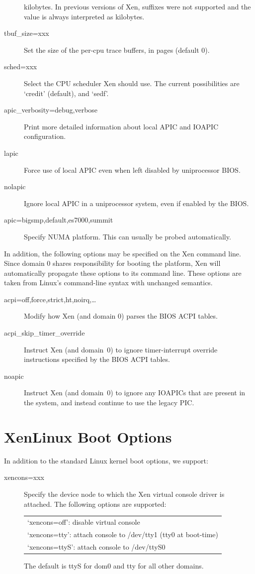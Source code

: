 \documentclass[11pt,twoside,final,openright]{report}
\begin{document}
\begin{description}
  kilobytes. In previous versions of Xen, suffixes were not supported
  and the value is always interpreted as kilobytes.
\item [ tbuf\_size=xxx ] Set the size of the per-cpu trace buffers, in
  pages (default 0).  
\item [ sched=xxx ] Select the CPU scheduler Xen should use.  The
  current possibilities are `credit' (default), and `sedf'.
\item [ apic\_verbosity=debug,verbose ] Print more detailed
  information about local APIC and IOAPIC configuration.
\item [ lapic ] Force use of local APIC even when left disabled by
  uniprocessor BIOS.
\item [ nolapic ] Ignore local APIC in a uniprocessor system, even if
  enabled by the BIOS.
\item [ apic=bigsmp,default,es7000,summit ] Specify NUMA platform.
  This can usually be probed automatically.
\end{description}

In addition, the following options may be specified on the Xen command
line. Since domain 0 shares responsibility for booting the platform,
Xen will automatically propagate these options to its command line.
These options are taken from Linux's command-line syntax with
unchanged semantics.

\begin{description}
\item [ acpi=off,force,strict,ht,noirq,\ldots ] Modify how Xen (and
  domain 0) parses the BIOS ACPI tables.
\item [ acpi\_skip\_timer\_override ] Instruct Xen (and domain~0) to
  ignore timer-interrupt override instructions specified by the BIOS
  ACPI tables.
\item [ noapic ] Instruct Xen (and domain~0) to ignore any IOAPICs
  that are present in the system, and instead continue to use the
  legacy PIC.
\end{description} 


\section{XenLinux Boot Options}

In addition to the standard Linux kernel boot options, we support:
\begin{description}
\item[ xencons=xxx ] Specify the device node to which the Xen virtual
  console driver is attached. The following options are supported:
  \begin{center}
    \begin{tabular}{l}
      `xencons=off': disable virtual console \\
      `xencons=tty': attach console to /dev/tty1 (tty0 at boot-time) \\
      `xencons=ttyS': attach console to /dev/ttyS0
    \end{tabular}
\end{center}
The default is ttyS for dom0 and tty for all other domains.
\end{description}
\end{document}
